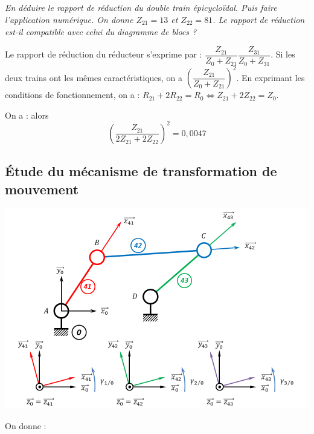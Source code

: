 \documentclass[10pt,fleqn]{article} %
\begin{document}
\begin{multicols}{2}
\begin{multicols}{2}
\subparagraph{}
\textit{En déduire le rapport de réduction du double train épicycloïdal. Puis faire l'application numérique. On donne $Z_{21}=13$ et $Z_{22}=81$. Le rapport de réduction est-il compatible avec celui du diagramme de blocs ?}

\ifprof
\begin{corrige}

Le rapport de réduction du réducteur s'exprime par : 
$\dfrac{Z_{21}}{Z_{0}+Z_{21}}\dfrac{Z_{31}}{Z_{0}+Z_{31}}$. Si les deux trains ont les mêmes caractéristiques, on a $\left(\dfrac{Z_{21}}{Z_{0}+Z_{21}}\right)^2$. 
En exprimant les conditions de fonctionnement, on a : 
$R_{21}+2R_{22}=R_0\Leftrightarrow Z_{21}+2Z_{22}=Z_0$. %

On a : alors 
$$
\left(\dfrac{Z_{21}}{2 Z_{21}+2Z_{22}}\right)^2=0,0047%
$$
\end{corrige}
\else \fi

\subsection*{Étude du mécanisme de transformation de mouvement}

\ifprof
\else

\begin{center}
\includegraphics[width=\linewidth]{images/A6_3barres}
\end{center}

On donne : 


\end{multicols}
\end{multicols}
\end{document}
